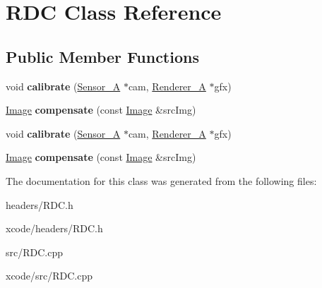 \hypertarget{class_r_d_c}{\section{R\-D\-C Class Reference}
\label{class_r_d_c}
}
\subsection*{Public Member Functions}
\begin{DoxyCompactItemize}
\item 
\hypertarget{class_r_d_c_a70face7e6f7c3f65772614fca001a52e}{void {\bfseries calibrate} (\hyperlink{class_sensor___a}{Sensor\-\_\-\-A} $\ast$cam, \hyperlink{class_renderer___a}{Renderer\-\_\-\-A} $\ast$gfx)}\label{class_r_d_c_a70face7e6f7c3f65772614fca001a52e}

\item 
\hypertarget{class_r_d_c_afd4c8763d879d5c811ed1329d1ab12a2}{\hyperlink{class_image}{Image} {\bfseries compensate} (const \hyperlink{class_image}{Image} \&src\-Img)}\label{class_r_d_c_afd4c8763d879d5c811ed1329d1ab12a2}

\item 
\hypertarget{class_r_d_c_a70face7e6f7c3f65772614fca001a52e}{void {\bfseries calibrate} (\hyperlink{class_sensor___a}{Sensor\-\_\-\-A} $\ast$cam, \hyperlink{class_renderer___a}{Renderer\-\_\-\-A} $\ast$gfx)}\label{class_r_d_c_a70face7e6f7c3f65772614fca001a52e}

\item 
\hypertarget{class_r_d_c_afd4c8763d879d5c811ed1329d1ab12a2}{\hyperlink{class_image}{Image} {\bfseries compensate} (const \hyperlink{class_image}{Image} \&src\-Img)}\label{class_r_d_c_afd4c8763d879d5c811ed1329d1ab12a2}

\end{DoxyCompactItemize}


The documentation for this class was generated from the following files\-:\begin{DoxyCompactItemize}
\item 
headers/R\-D\-C.\-h\item 
xcode/headers/R\-D\-C.\-h\item 
src/R\-D\-C.\-cpp\item 
xcode/src/R\-D\-C.\-cpp\end{DoxyCompactItemize}
